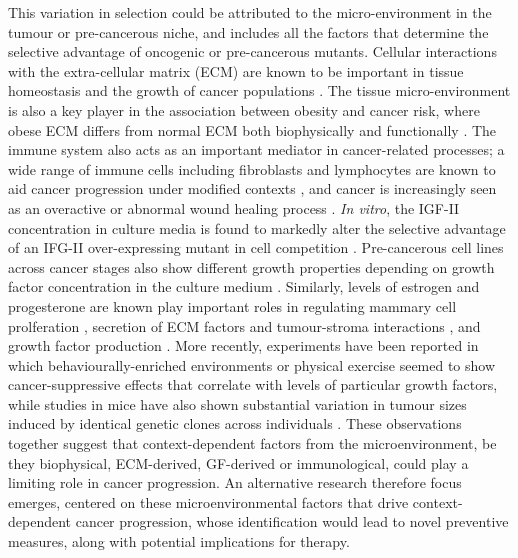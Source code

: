 \documentclass[12pt,onecolumn,twoside]{article}
\begin{document}
This variation in selection could be attributed to the micro-environment in the tumour or pre-cancerous niche, and includes all the factors that determine the selective advantage of oncogenic or pre-cancerous mutants. Cellular interactions with the extra-cellular matrix (ECM) are known to be important in tissue homeostasis \autocite{Hansen2000} and the growth of cancer populations \autocite{Pietras2010}. The tissue micro-environment is also a key player in the association between obesity and cancer risk, where obese ECM differs from normal ECM both biophysically \autocite{Druso2018} and functionally \autocite{Iyengar2016}. The immune system also acts as an important mediator in cancer-related processes; a wide range of immune cells including fibroblasts and lymphocytes are known to aid cancer progression under modified contexts \autocite{Hanahan2012}, and cancer is increasingly seen as an overactive or abnormal wound healing process \autocite{Schafer2008}. \textit{In vitro}, the IGF-II concentration in culture media is found to markedly alter the selective advantage of an IFG-II over-expressing mutant in cell competition \autocite{Archetti2015}. Pre-cancerous cell lines across cancer stages also show different growth properties depending on growth factor concentration in the culture medium \autocite{Chan2014}. Similarly, levels of estrogen and progesterone are known play important roles in regulating mammary cell prolferation \autocite{Haslam2001}, secretion of ECM factors and tumour-stroma interactions \autocite{Woodward2000}, and growth factor production \autocite{DICKSON1987}. More recently, experiments have been reported in which behaviourally-enriched environments or physical exercise seemed to show cancer-suppressive effects \autocite{Cao2010,Rundqvist2013} that correlate with levels of particular growth factors, while studies in mice have also shown substantial variation in tumour sizes induced by identical genetic clones across individuals \autocite{Rogers2017}. These observations together suggest that context-dependent factors from the microenvironment, be they biophysical, ECM-derived, GF-derived or immunological, could play a limiting role in cancer progression. An alternative research therefore focus emerges, centered on these microenvironmental factors that drive context-dependent cancer progression, whose identification would lead to novel preventive measures, along with potential implications for therapy.
\end{document}

